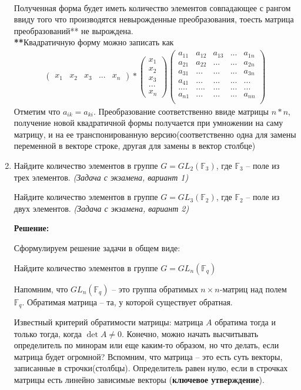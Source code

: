 \documentclass[]{book}
\theoremstyle{definition}
\begin{document}
\begin{enumerate}[resume]
\\
Полученная форма будет иметь количество элементов совпадающее с рангом ввиду того что производятся невырожденные преобразования, тоесть матрица преобразований** не вырождена.\\
\textbf{**}Квадратичную форму можно записать как
\begin{align*}
\begin{pmatrix}
x_1& x_2&x_3&...&x_n
\end{pmatrix}*
\begin{pmatrix}
x_1\\ x_2\\x_3\\...\\x_n
\end{pmatrix}
\begin{pmatrix}
a_{11}&a_{12}&a_{13}&...&a_{1n}\\
a_{21}&a_{22}&...&...&a_{2n}\\
a_{31}&...&...&...&a_{3n}\\
a_{41}&...&...&...&...\\
....&....&...&...&...\\
a_{n1}&...&...&...&a_{nn}\\
\end{pmatrix}\end{align*}
Отметим что $a_{ik}=a_{ki}$. Преобразование соответственно ввиде матрицы $n*n$, получение новой квадратичной формы получается при умножении на саму матрицу, и на ее транспонированную версию(соответственно одна для замены переменной в векторе строке, другая для замены в вектор столбце)

\item Найдите количество элементов в группе $G = GL_2(\mathbb{F}_3)$, где $\mathbb{F}_3$ -- поле из трех элементов. \textit{(Задача с экзамена, вариант 1)} 

Найдите количество элементов в группе $G = GL_3(\mathbb{F}_2)$, где $\mathbb{F}_2$ -- поле из двух элементов. \textit{(Задача с экзамена, вариант 2)} 


\textbf{Решение:}

Сформулируем решение задачи в общем виде: 

Найдите количество элементов в группе $G = GL_n(\mathbb{F}_q)$

Напомним, что $GL_n(\mathbb{F}_q)$ -- это группа обратимых $n\times n$-матриц над полем $\mathbb{F}_q$. Обратимая матрица -- та, у которой существует обратная.

Известный критерий обратимости матрицы: матрица $A$ обратима тогда и только тогда, когда $\det A \neq 0$. Конечно, можно начать высчитывать определитель по минорам или еще каким-то образом, но что делать, если матрица будет огромной? Вспомним, что матрица -- это есть суть векторы, записанные в строчки(столбцы). Определитель равен нулю, если в строчках матрицы есть линейно зависимые векторы (\textbf{ключевое утверждение}). 


\end{enumerate}
\end{document}
